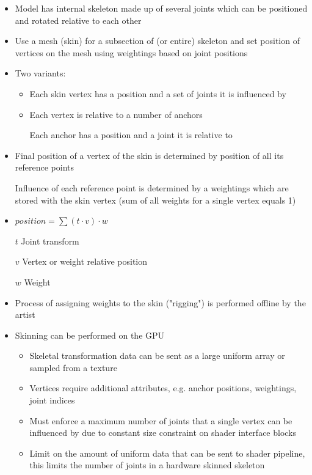 \documentclass[a4paper]{article}
\begin{document}
\begin{itemize}
  \item
    Model has internal skeleton made up of several joints which can be
    positioned and rotated relative to each other

  \item
    Use a mesh (skin) for a subsection of (or entire) skeleton and set position
    of vertices on the mesh using weightings based on joint positions

  \item
    Two variants:

    \begin{itemize}
      \item
        Each skin vertex has a position and a set of joints it is influenced by

      \item
        Each vertex is relative to a number of anchors

        Each anchor has a position and a joint it is relative to

    \end{itemize}

  \item
    Final position of a vertex of the skin is determined by position of all its
    reference points

    Influence of each reference point is determined by a weightings which are
    stored with the skin vertex (sum of all weights for a single vertex equals
    1)

  \item
    $position = \sum{(t \cdot v) \cdot w}$

    $t$ Joint transform

    $v$ Vertex or weight relative position

    $w$ Weight

  \item
    Process of assigning weights to the skin ("rigging") is performed offline by
    the artist

  \item
    Skinning can be performed on the GPU

    \begin{itemize}
      \item
        Skeletal transformation data can be sent as a large uniform array or
        sampled from a texture

      \item
        Vertices require additional attributes, e.g. anchor positions,
        weightings, joint indices

      \item
        Must enforce a maximum number of joints that a single vertex can be
        influenced by due to constant size constraint on shader interface blocks

      \item
        Limit on the amount of uniform data that can be sent to shader pipeline,
        this limits the number of joints in a hardware skinned skeleton

    \end{itemize}

\end{itemize}
\end{document}
